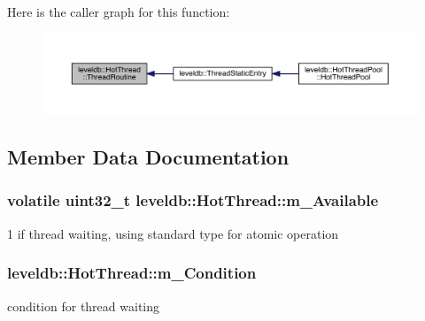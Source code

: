 Here is the caller graph for this function\+:\nopagebreak
\begin{figure}[H]
\begin{center}
\leavevmode
\includegraphics[width=350pt]{structleveldb_1_1_hot_thread_a7c436b64fe276361ead18ec4242e5001_icgraph}
\end{center}
\end{figure}




\subsection{Member Data Documentation}
\hypertarget{structleveldb_1_1_hot_thread_af6a8ce25afa9a8a54ddc453a456cd08e}{}
\subsubsection[{m\+\_\+\+Available}]{\setlength{\rightskip}{0pt plus 5cm}volatile {\bf uint32\+\_\+t} leveldb\+::\+Hot\+Thread\+::m\+\_\+\+Available}\label{structleveldb_1_1_hot_thread_af6a8ce25afa9a8a54ddc453a456cd08e}


1 if thread waiting, using standard type for atomic operation 

\hypertarget{structleveldb_1_1_hot_thread_a125803d2ca640557d1c7a62eb666fb70}{}
\subsubsection[{m\+\_\+\+Condition}]{ leveldb\+::\+Hot\+Thread\+::m\+\_\+\+Condition}\label{structleveldb_1_1_hot_thread_a125803d2ca640557d1c7a62eb666fb70}


condition for thread waiting 

\hypertarget{structleveldb_1_1_hot_thread_a18e771cb85ee461a0a790ee5a405f1e7}{}
